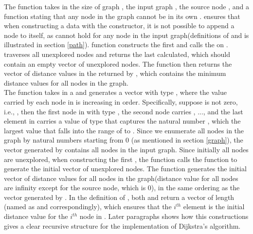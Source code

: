 The  function takes in the size of graph , the input graph , the source node , and a function  stating that any node in the graph cannot be in its own .  ensures that when constructing a  data with the  constructor, it is not possible to append a node  to itself, as  cannot hold for any node in the input graph(definitions of  and  is illustrated in section \ref{path}).  function constructs the first   and calls the  on .  traverses all unexplored nodes and returns the last  calculated, which should contain an empty vector of unexplored nodes. The  function then returns the vector of distance values in the  returned by , which contains the minimum distance values for all nodes in the graph. 
\\

The  function takes in a  and generates a vector  with type , where the  value carried by each node in  is increasing in order. Specifically, suppose  is not zero, i.e., , then the first node in   with type , the second node carries , ..., and the last element in  carries a value of type  that captures the natural number , which the largest  value that falls into the range of  to . Since we enumerate all nodes in the graph by natural numbers starting from 0 (as mentioned in section \ref{graph}), the vector generated by  contains all nodes in the input graph. Since initially all nodes are unexplored, when constructing the first , the  function calls the  function to generate the initial vector of unexplored nodes. The  function generates the initial vector of distance values for all nodes in the graph(distance value for all nodes are infinity except for the source node, which is 0), in the same ordering as the vector generated by . In the definition of , both  and  return a vector of length  (named as  and  correspondingly), which ensures that the $i^{th}$ element  is the initial distance value for the $i^{th}$ node in . Later paragraphs shows how this constructions gives a clear recursive structure for the implementation of Dijkstra's algorithm. 
\\


